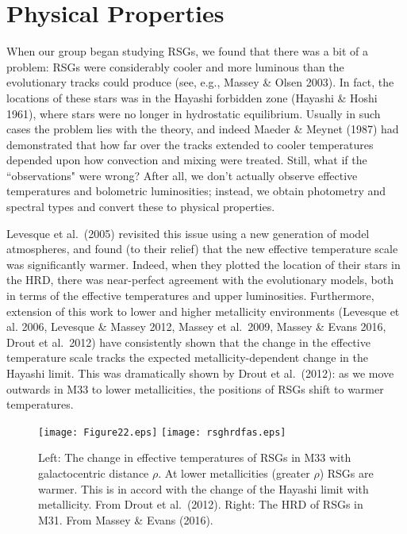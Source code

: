 \documentclass{iau}
\begin{document}
\section{Physical Properties}
When our group began studying RSGs, we found that there was a bit of a problem: RSGs were considerably cooler and
more luminous than the evolutionary tracks could produce (see, e.g., Massey \& Olsen 2003).  In fact, the locations of these stars was in
the Hayashi forbidden zone (Hayashi \& Hoshi 1961), where stars were no longer in hydrostatic equilibrium.  Usually in such cases the problem lies with the theory, and indeed Maeder \& Meynet (1987) had demonstrated that how far over
the tracks extended to cooler temperatures depended upon how convection and mixing were treated.  Still, what if the
``observations" were wrong?  After all, we don't actually observe effective temperatures and bolometric luminosities; instead, we obtain photometry and spectral types and convert these to physical properties.


Levesque et al.\ (2005) revisited this issue using a new generation of model atmospheres, and found (to their relief) that the
new effective temperature scale was significantly warmer.  Indeed, when they plotted the location of their stars in the HRD,
there was near-perfect agreement with the evolutionary models, both in terms of the effective temperatures and upper luminosities.  Furthermore, extension of this work to lower and higher metallicity environments (Levesque et al. 2006, Levesque \& Massey 2012, Massey et al.\ 2009, Massey \& Evans 2016, Drout et al.\, 2012) have consistently shown that the change in the effective temperature scale tracks the expected metallicity-dependent change in the Hayashi limit.   This was dramatically shown  by Drout et al.\ (2012): as we move outwards in M33 to lower metallicities, the positions of RSGs shift to warmer temperatures. 


\begin{figure}[h!]
\begin{center}
\texttt{[image: Figure22.eps]} 
\texttt{[image: rsghrdfas.eps]}
\caption{Left: The change in effective temperatures of RSGs in M33 with galactocentric distance $\rho$.  At lower metallicities (greater $\rho$) RSGs are warmer.  This is in accord with the change of the Hayashi limit with metallicity. From Drout et al.\ (2012). Right: The HRD of RSGs in M31.  From Massey \& Evans (2016). }
 \label{fig:drout}
\end{center}
\end{figure}
\end{document}
